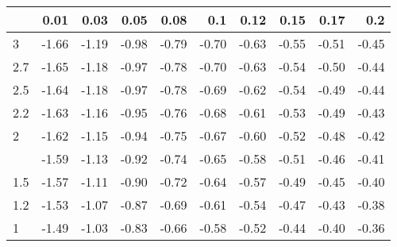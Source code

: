 
\begin{tabular}{lrrrrrrrrr}
\toprule
  & 0.01 & 0.03 & 0.05 & 0.08 & 0.1 & 0.12 & 0.15 & 0.17 & 0.2\\
\midrule
3 & -1.66 & -1.19 & -0.98 & -0.79 & -0.70 & -0.63 & -0.55 & -0.51 & -0.45\\
2.7 & -1.65 & -1.18 & -0.97 & -0.78 & -0.70 & -0.63 & -0.54 & -0.50 & -0.44\\
2.5 & -1.64 & -1.18 & -0.97 & -0.78 & -0.69 & -0.62 & -0.54 & -0.49 & -0.44\\
2.2 & -1.63 & -1.16 & -0.95 & -0.76 & -0.68 & -0.61 & -0.53 & -0.49 & -0.43\\
2 & -1.62 & -1.15 & -0.94 & -0.75 & -0.67 & -0.60 & -0.52 & -0.48 & -0.42\\
\addlinespace
1.7 & -1.59 & -1.13 & -0.92 & -0.74 & -0.65 & -0.58 & -0.51 & -0.46 & -0.41\\
1.5 & -1.57 & -1.11 & -0.90 & -0.72 & -0.64 & -0.57 & -0.49 & -0.45 & -0.40\\
1.2 & -1.53 & -1.07 & -0.87 & -0.69 & -0.61 & -0.54 & -0.47 & -0.43 & -0.38\\
1 & -1.49 & -1.03 & -0.83 & -0.66 & -0.58 & -0.52 & -0.44 & -0.40 & -0.36\\
\bottomrule
\end{tabular}
